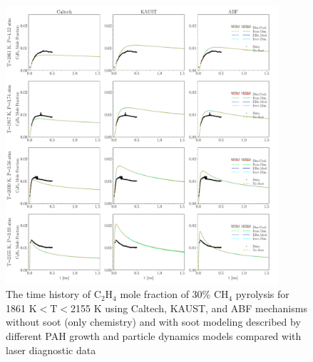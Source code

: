 \begin{figure}[H]
	\centering
	\includegraphics[width=0.9\textwidth]{Figures/Results/Shocktube/Stanford/june/30CH4_C2H4_mechs_s0.pdf}
	\caption{The time history of $\mathrm{C_2H_4}$ mole fraction of 30\% $\mathrm{CH_4}$ pyrolysis for 1861 K$<\mathrm{T}<$2155 K using Caltech, KAUST, and ABF mechanisms without soot (only chemistry) and with soot modeling described by different PAH growth and particle dynamics models compared with laser diagnostic data}
	\label{fig:shocktubest_30ch4_c2h4_0} 
\end{figure}


